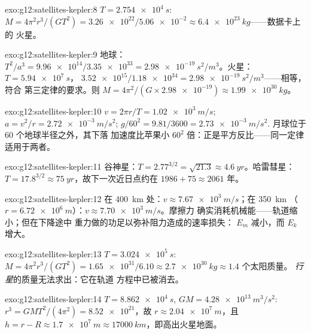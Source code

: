 \begin{solution}{exo:g12:satellites-kepler:8}
$T = \qty{2.754e4}{s}$: $M = 4\pi^2 r^3/(GT^2) =
\num{3.26e22}/\num{5.06e-2} \approx \qty{6.4e23}{kg}$——数据卡上的
火星。
\end{solution}

\begin{solution}{exo:g12:satellites-kepler:9}
地球：$T^2/a^3 = \num{9.96e14}/\num{3.35e33} =
\qty{2.98e-19}{s^2/m^3}$。火星：$T = \qty{5.94e7}{s}$，
$\num{3.52e15}/\num{1.18e34} = \qty{2.98e-19}{s^2/m^3}$——相等，符合
第三定律的要求。则 $M = 4\pi^2/(G \times \num{2.98e-19})
\approx \qty{1.99e30}{kg}$。
\end{solution}

\begin{solution}{exo:g12:satellites-kepler:10}
$v = 2\pi r/T = \qty{1.02e3}{m/s}$; $a = v^2/r =
\qty{2.72e-3}{m/s^2}$; $g/60^2 = 9.81/3600 = \qty{2.73e-3}{m/s^2}$.
月球位于 $60$ 个地球半径之外，其下落
加速度比苹果小 $60^2$ 倍：正是平方反比——同一定律
适用于两者。
\end{solution}

\begin{solution}{exo:g12:satellites-kepler:11}
谷神星：$T = 2.77^{3/2} = \sqrt{21.3} \approx \qty{4.6}{yr}$。哈雷彗星：
$T = 17.8^{3/2} \approx \qty{75}{yr}$，故下一次近日点约在
$1986 + 75 \approx 2061$ 年。
\end{solution}

\begin{solution}{exo:g12:satellites-kepler:12}
在 \qty{400}{km} 处：$v \approx \qty{7.67e3}{m/s}$；在 \qty{350}{km}
（$r = \qty{6.72e6}{m}$）：$v \approx \qty{7.70e3}{m/s}$。摩擦力
确实消耗机械能——轨道缩小；但在下降途中
重力做的功足以弥补阻力造成的速率损失：
$E_m$ 减小，而 $E_k$ 增大。
\end{solution}

\begin{solution}{exo:g12:satellites-kepler:13}
$T = \qty{3.024e5}{s}$: $M = 4\pi^2 r^3/(GT^2) =
\num{1.65e31}/6.10 \approx \qty{2.7e30}{kg} \approx 1.4$ 个太阳质量。
\emph{行星}的质量无法求出：它在轨道
方程中已被消去。
\end{solution}

\begin{solution}{exo:g12:satellites-kepler:14}
$T = \qty{8.862e4}{s}$, $GM = \qty{4.28e13}{m^3/s^2}$:
$r^3 = GMT^2/(4\pi^2) = \num{8.52e21}$，故 $r \approx
\qty{2.04e7}{m}$，且 $h = r - R \approx \qty{1.7e7}{m} \approx
\qty{17000}{km}$，即高出火星地面。
\end{solution}


